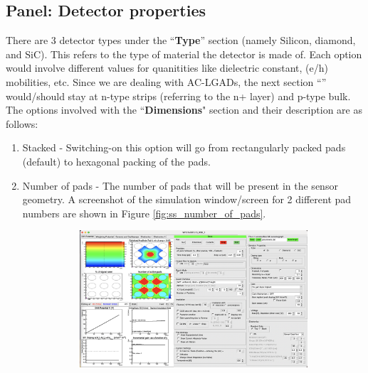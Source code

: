 \documentclass[11pt]{article}
\begin{document}
\subsection{Panel: Detector properties}
There are 3 detector types under the ``\textbf{Type}'' section (namely Silicon, diamond, and SiC). This refers to the type of material the detector is made of. Each option would involve different values for quanitities like dielectric constant, (e/h) mobilities, etc.
\newline
Since we are dealing with AC-LGADs, the next section ``\textbf{}'' would/should stay at n-type strips (referring to the n+ layer) and p-type bulk.
\newline
The options involved with the ``\textbf{Dimensions}" section and their description are as follows:
\begin{enumerate}
    \item Stacked - Switching-on this option will go from rectangularly packed pads (default) to hexagonal packing of the pads.
    \item Number of pads - The number of pads that will be present in the sensor geometry. A screenshot of the simulation window/screen for 2 different pad numbers are shown in Figure \ref{fig:ss_number_of_pads}.
    \begin{figure}[h!]
        \centering
        \begin{subfigure}[t]{0.99\textwidth}
            \centering
            \includegraphics[width=5in]{Images/3x3_pad_structure.png}
            \caption{}
            \label{fig:3x3_pad_field}
        \end{subfigure}%


\end{figure}
\end{enumerate}
\end{document}
